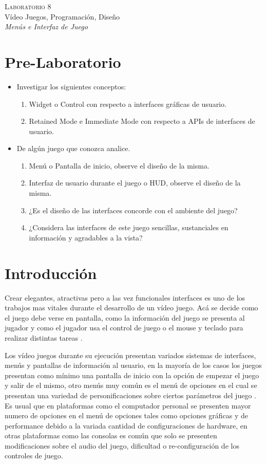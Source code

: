 \begin{center}
\textsc{\Large Laboratorio 8}~\\
{\large Vídeo Juegos, Programación, Diseño}~\\
\emph{Menús e Interfaz de Juego}
\end{center}

\section{Pre-Laboratorio}
\begin{itemize}
\item Investigar los siguientes conceptos:
\begin{enumerate}
  \item Widget o Control con respecto a interfaces gráficas de usuario.
  \item Retained Mode e Immediate Mode con respecto a APIs de interfaces de usuario.
\end{enumerate}
\item De algún juego que conozca analice.
\begin{enumerate}
  \item Menú o Pantalla de inicio, observe el diseño de la misma.
  \item Interfaz de usuario durante el juego o HUD, observe el diseño de la misma.
  \item ¿Es el diseño de las interfaces concorde con el ambiente del juego?
  \item ¿Considera las interfaces de este juego sencillas, sustanciales en información y agradables a la vista?
\end{enumerate}
\end{itemize}

\section{Introducción}
Crear elegantes, atractivas pero a las vez funcionales interfaces es uno de los trabajos mas vitales durante el desarrollo de un vídeo juego. Acá se decide como el juego debe verse en pantalla, como la información del juego se presenta al jugador y como el jugador usa el control de juego o el mouse y teclado para realizar distintas tareas \cite[p.~26]{jenkinscreatinggames}.

Los vídeo juegos durante su ejecución presentan variados sistemas de interfaces, menús y pantallas de información al usuario, en la mayoría de los casos los juegos presentan como mínimo una pantalla de inicio con la opción de empezar el juego y salir de el mismo, otro menús muy común es el menú de  opciones en el cual se presentan una variedad de personificaciones sobre ciertos parámetros del juego \cite{gb_optionsmenu}. Es usual que en plataformas como el computador personal se presenten mayor numero de opciones en el menú de opciones tales como opciones gráficas y de performance debido a la variada cantidad de configuraciones de hardware, en otras plataformas como las consolas es común que solo se presenten modificaciones sobre el audio del juego, dificultad o re-configuración de los controles de juego.

